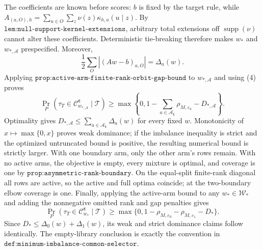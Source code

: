 The coefficients are known before scores: \(b\) is fixed by the target rule, while \(A_{(a,O),h}=\sum_{u\in O}\sum_z\nu(z)\kappa_{h,a}(u\mid z)\). By \(\texttt{lem:null-support-kernel-extensions}\), arbitrary total extensions off \(\operatorname{supp}(\nu)\) cannot alter these coefficients. Deterministic tie-breaking therefore makes \(w_*\) and \(w_{*,\mathcal A}\) prespecified. Moreover, \[\frac12\sum_O|(Aw-b)_{a,O}|=\Delta_a(w).\tag{4}\] Applying \(\texttt{prop:active-arm-finite-rank-orbit-gap-bound}\) to \(w_{*,\mathcal A}\) and using (4) proves \[\Pr_P(\tau_T\in\mathcal C^{\boldsymbol\varepsilon}_{w_{*,\mathcal A}}\mid\mathcal T)\ge\max\left\{0,1-\sum_{a\in\mathcal A_{\boldsymbol\varepsilon}}\rho_{M,\varepsilon_a}-D_{*,\mathcal A}\right\}.\tag{5}\] Optimality gives \(D_{*,\mathcal A}\le\sum_{a\in\mathcal A_{\boldsymbol\varepsilon}}\Delta_a(w)\) for every fixed \(w\). Monotonicity of \(x\mapsto\max\{0,x\}\) proves weak dominance; if the imbalance inequality is strict and the optimized untruncated bound is positive, the resulting numerical bound is strictly larger.
With one boundary arm, only the other arm's rows remain. With no active arms, the objective is empty, every mixture is optimal, and coverage is one by \(\texttt{prop:asymmetric-rank-boundary}\). On the equal-split finite-rank diagonal all rows are active, so the active and full optima coincide; at the two-boundary elbow coverage is one. Finally, applying the active-arm bound to any \(w_*\in\mathcal W_*\) and adding the nonnegative omitted rank and gap penalties gives \[\Pr_P(\tau_T\in\mathcal C^{\boldsymbol\varepsilon}_{w_*}\mid\mathcal T)\ge\max\{0,1-\rho_{M,\varepsilon_0}-\rho_{M,\varepsilon_1}-D_*\}.\] Since \(D_*\le\Delta_0(w)+\Delta_1(w)\), its weak and strict dominance claims follow identically. The empty-library conclusion is exactly the convention in \(\texttt{def:minimum-imbalance-common-selector}\).